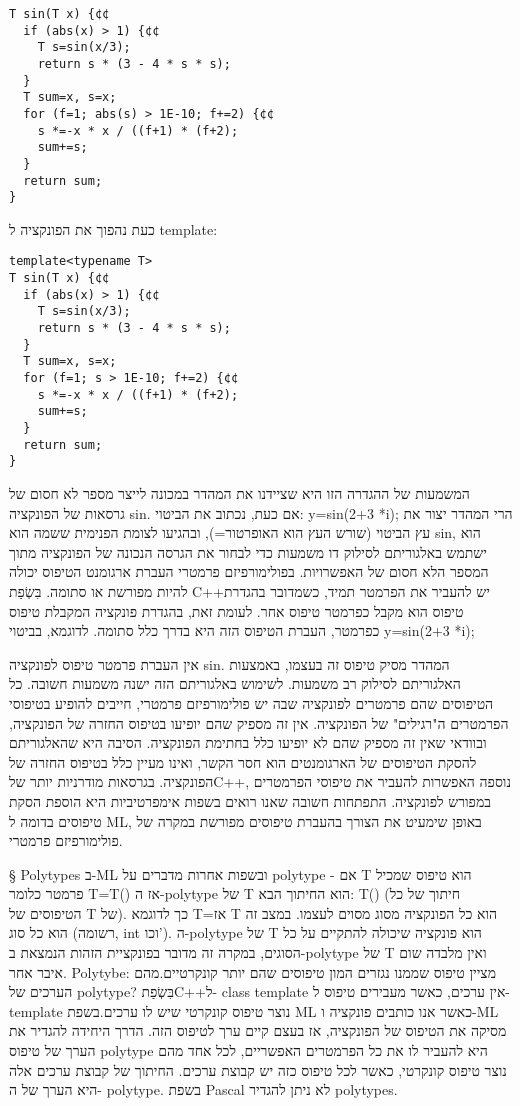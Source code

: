 \begin{טבלא}[!htbp]
\begin{verbatim}
T sin(T x) {¢¢
  if (abs(x) > 1) {¢¢
    T s=sin(x/3);
    return s * (3 - 4 * s * s);
  }
  T sum=x, s=x;
  for (f=1; abs(s) > 1E-10; f+=2) {¢¢
    s *=-x * x / ((f+1) * (f+2);
    sum+=s;
  }
  return sum;
}
\end{verbatim}

        כעת נהפוך את הפונקציה ל template:

\begin{verbatim}
template<typename T>
T sin(T x) {¢¢
  if (abs(x) > 1) {¢¢
    T s=sin(x/3);
    return s * (3 - 4 * s * s);
  }
  T sum=x, s=x;
  for (f=1; s > 1E-10; f+=2) {¢¢
    s *=-x * x / ((f+1) * (f+2);
    sum+=s;
  }
  return sum;
}
\end{verbatim}

המשמעות של ההגדרה הזו היא שציידנו את המהדר במכונה לייצר מספר לא חסום של גרסאות של הפונקציה sin. אם כעת, נכתוב את הביטוי:
        y=sin(2+3 *i);
הרי המהדר יצור את עץ הביטוי (שורש העץ הוא האופרטור=), ובהגיעו לצומת הפנימית
ששמה הוא sin, הוא ישתמש באלגוריתם לסילוק דו משמעות כדי לבחור את הגרסה הנכונה של
הפונקציה מתוך המספר הלא חסום של האפשרויות. בפולימורפיזם פרמטרי העברת ארגומנט
הטיפוס יכולה להיות מפורשת או סתומה. בִּשְׂפַת C++יש להעביר את הפרמטר תמיד, כשמדובר
בהגדרת טיפוס הוא מקבל כפרמטר טיפוס אחר. לעומת זאת, בהגדרת פונקציה המקבלת טיפוס
כפרמטר, העברת הטיפוס הזה היא בדרך כלל סתומה. לדוגמא, בביטוי
        y=sin(2+3 *i);

אין העברת פרמטר טיפוס לפונקציה sin. המהדר מסיק טיפוס זה בעצמו, באמצעות
האלגוריתם לסילוק רב משמעות. לשימוש באלגוריתם הזה ישנה משמעות חשובה. כל הטיפוסים
שהם פרמטרים לפונקציה שבה יש פולימורפיזם פרמטרי, חייבים להופיע בטיפוסי הפרמטרים
ה"רגילים" של הפונקציה. אין זה מספיק שהם יופיעו בטיפוס החזרה של הפונקציה,
ובוודאי שאין זה מספיק שהם לא יופיעו כלל בחתימת הפונקציה. הסיבה היא שהאלגוריתם
להסקת הטיפוסים של הארגומנטים הוא חסר הקשר, ואינו מעיין כלל בטיפוס החזרה של
הפונקציה. בגרסאות מודרניות יותר שלC++, נוספה האפשרות להעביר את טיפוסי
הפרמטרים במפורש לפונקציה. התפתחות חשובה שאנו רואים בשפות אימפרטיביות היא הוספת
הסקת טיפוסים בדומה ל ML, באופן שימעיט את הצורך בהעברת טיפוסים מפורשת במקרה של
פולימורפיזם פרמטרי.

§ Polytypes
ב-ML ובשפות אחרות מדברים על polytype - אם T הוא טיפוס שמכיל פרמטר כלומר T=T()
אז ה-polytype של T הוא החיתוך הבא: T() (חיתוך של כל הטיפוסים של T של). כך
לדוגמא T=אז T הוא כל הפונקציה מסוג מסוים לעצמו. במצב זה הוא כל סוג (רשומה, int
וכו'). ה-polytype של T הוא פונקציה שיכולה להתקיים על כל הסוגים, במקרה זה מדובר
בפונקציית הזהות הנמצאת ב-polytype של T ואין מלבדה שום איבר אחר. Polytybe:
מציין טיפוס שממנו נגזרים המון טיפוסים שהם יותר קונקרטיים.מהם הערכים של
polytype? בִּשְׂפַתC++ל- class template אין ערכים, כאשר מעבירים טיפוס ל- template
נוצר טיפוס קונקרטי שיש לו ערכים.בשפת ML כאשר אנו כותבים פונקציה ו-ML מסיקה את
הטיפוס של הפונקציה, אז בעצם קיים ערך לטיפוס הזה. הדרך היחידה להגדיר את הערך של
טיפוס polytype היא להעביר לו את כל הפרמטרים האפשריים, לכל אחד מהם נוצר טיפוס
קונקרטי, כאשר לכל טיפוס כזה יש קבוצת ערכים. החיתוך של קבוצת ערכים אלה היא הערך
של ה- polytype. בשפת Pascal לא ניתן להגדיר polytypes.


\end{טבלא}
